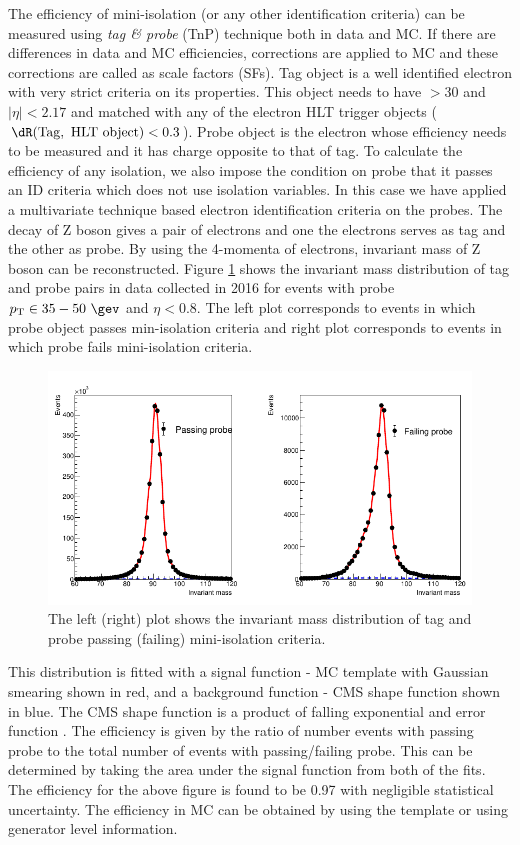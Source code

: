 The efficiency of mini-isolation (or any other identification criteria) can be measured using \textit{tag \& probe} (TnP) technique both 
in data and MC. If there are differences in data and MC efficiencies, corrections are applied to MC and these corrections are called as 
scale factors (SFs). Tag object is a well identified electron with very strict criteria on its properties. This object needs to have \pt 
$>30$ \gev and $|\eta|<2.17$ and matched with any of the electron HLT trigger objects ($\dR(\mathrm{Tag,\ HLT\ object})<0.3$). Probe 
object is the electron whose efficiency needs to be measured and it has charge opposite to that of tag. To calculate the efficiency of any 
isolation, we also impose the condition on probe that it passes an ID criteria which does not use isolation variables. In this case we 
have applied a multivariate technique based electron identification criteria on the probes. The decay of Z boson gives a pair of electrons 
and one the electrons serves as tag and the other as probe. By using the 4-momenta of electrons, invariant mass of Z boson can be 
reconstructed. Figure \ref{fig:bin25_el_sc_eta_0p00To0p80_el_pt_35p00To50p00} shows the invariant mass distribution of tag and probe pairs 
in data collected in 2016 for events with probe $\pt \in 35 - 50\ \gev$ and $\eta < 0.8$. The left plot corresponds to events in which 
probe object passes min-isolation criteria and right plot corresponds to events in which probe fails mini-isolation criteria. 
\begin{figure}[h!]
\centering
\includegraphics[width=0.9\linewidth]{../Figures/Chap2/bin25_el_sc_eta_0p00To0p80_el_pt_35p00To50p00}
\captionsetup{width=.9\linewidth}
\caption[TnP fit for MiniIso pass/fail]{The left (right) plot shows the invariant mass distribution of tag and probe passing (failing) 
mini-isolation criteria.}
\label{fig:bin25_el_sc_eta_0p00To0p80_el_pt_35p00To50p00}
\end{figure}
This distribution is fitted with a signal function - MC template with Gaussian smearing shown in red, and a background function - CMS 
shape function shown in blue. The CMS shape function is a product of falling exponential and error function \cite{Meyer:2239058}. The 
efficiency is given by the ratio of number events with passing probe to the total number of events with passing/failing probe. This can be 
determined by taking the area under the signal function from both of the fits. The efficiency for the above figure is found to be 0.97 
with negligible statistical uncertainty. The efficiency in MC can be obtained by using the template or using generator level information.

